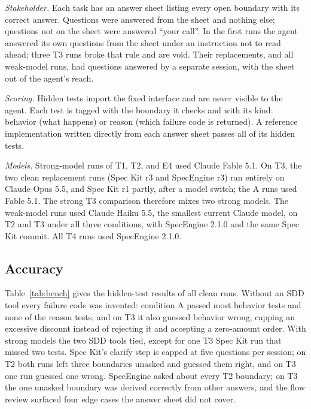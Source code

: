 \documentclass[conference]{IEEEtran}
\begin{document}
\emph{Stakeholder.} Each task has an answer sheet listing every open boundary with its correct answer. Questions were answered from the sheet and nothing else; questions not on the sheet were answered ``your call''. In the first runs the agent answered its own questions from the sheet under an instruction not to read ahead; three T3 runs broke that rule and are void. Their replacements, and all weak-model runs, had questions answered by a separate session, with the sheet out of the agent's reach.

\emph{Scoring.} Hidden tests import the fixed interface and are never visible to the agent. Each test is tagged with the boundary it checks and with its kind: behavior (what happens) or reason (which failure code is returned). A reference implementation written directly from each answer sheet passes all of its hidden tests.

\emph{Models.} Strong-model runs of T1, T2, and E4 used Claude Fable 5.1. On T3, the two clean replacement runs (Spec Kit r3 and SpecEngine r3) ran entirely on Claude Opus 5.5, and Spec Kit r1 partly, after a model switch; the A runs used Fable 5.1. The strong T3 comparison therefore mixes two strong models. The weak-model runs used Claude Haiku 5.5, the smallest current Claude model, on T2 and T3 under all three conditions, with SpecEngine 2.1.0 and the same Spec Kit commit. All T4 runs used SpecEngine 2.1.0.

\subsection{Accuracy}

Table~\ref{tab:bench} gives the hidden-test results of all clean runs. Without an SDD tool every failure code was invented: condition A passed most behavior tests and none of the reason tests, and on T3 it also guessed behavior wrong, capping an excessive discount instead of rejecting it and accepting a zero-amount order. With strong models the two SDD tools tied, except for one T3 Spec Kit run that missed two tests. Spec Kit's clarify step is capped at five questions per session; on T2 both runs left three boundaries unasked and guessed them right, and on T3 one run guessed one wrong. SpecEngine asked about every T2 boundary; on T3 the one unasked boundary was derived correctly from other answers, and the flow review surfaced four edge cases the answer sheet did not cover.
\end{document}
